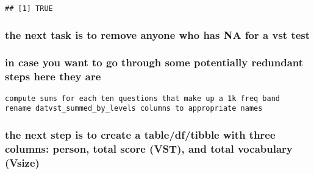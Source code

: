 \documentclass[
]{article}
\newenvironment{Shaded}{\begin{snugshade}}{\end{snugshade}}
\newcommand{\CommentTok}[1]{\textcolor[rgb]{0.56,0.35,0.01}{\textit{#1}}}
\newcommand{\DecValTok}[1]{\textcolor[rgb]{0.00,0.00,0.81}{#1}}
\newcommand{\KeywordTok}[1]{\textcolor[rgb]{0.13,0.29,0.53}{\textbf{#1}}}
\newcommand{\NormalTok}[1]{#1}
\newcommand{\OperatorTok}[1]{\textcolor[rgb]{0.81,0.36,0.00}{\textbf{#1}}}
\newcommand{\StringTok}[1]{\textcolor[rgb]{0.31,0.60,0.02}{#1}}
\begin{document}
\begin{verbatim}
## [1] TRUE
\end{verbatim}

\hypertarget{the-next-task-is-to-remove-anyone-who-has-na-for-a-vst-test}{%
\subsubsection{the next task is to remove anyone who has NA for a vst
test}\label{the-next-task-is-to-remove-anyone-who-has-na-for-a-vst-test}}

\begin{Shaded}
\end{Shaded}

\hypertarget{in-case-you-want-to-go-through-some-potentially-redundant-steps-here-they-are}{%
\subsubsection{in case you want to go through some potentially redundant
steps here they
are}\label{in-case-you-want-to-go-through-some-potentially-redundant-steps-here-they-are}}

\texttt{compute\ sums\ for\ each\ ten\ questions\ that\ make\ up\ a\ 1k\ freq\ band}
\texttt{rename\ datvst\_summed\_by\_level\textquotesingle{}s\ columns\ to\ appropriate\ names}

\hypertarget{the-next-step-is-to-create-a-tabledftibble-with-three-columns-person-total-score-vst-and-total-vocabulary-vsize}{%
\subsubsection{the next step is to create a table/df/tibble with three
columns: person, total score (VST), and total vocabulary
(Vsize)}\label{the-next-step-is-to-create-a-tabledftibble-with-three-columns-person-total-score-vst-and-total-vocabulary-vsize}}
\end{document}
